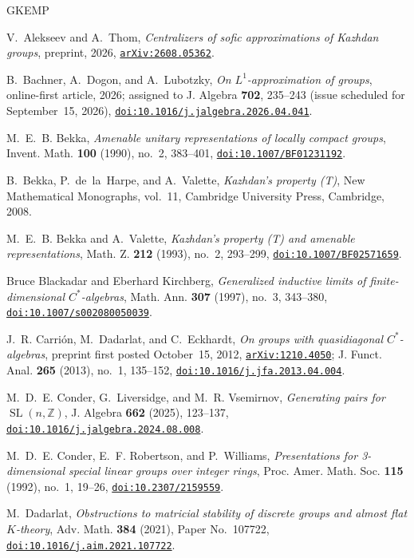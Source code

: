 \documentclass[11pt]{amsart}
\newcommand{\doi}[1]{\href{https://doi.org/#1}{\nolinkurl{doi:#1}}}
\newcommand{\arxiv}[1]{\href{https://arxiv.org/abs/#1}{\nolinkurl{arXiv:#1}}}
\theoremstyle{definition}
\theoremstyle{remark}
\theoremstyle{plain}
\newcommand{\SL}{\operatorname{SL}}
\begin{document}
\begin{thebibliography}{GKEMP}

V.~Alekseev and A.~Thom,
\emph{Centralizers of sofic approximations of Kazhdan groups},
preprint, 2026, \arxiv{2608.05362}.

B.~Bachner, A.~Dogon, and A.~Lubotzky,
\emph{On $L^1$-approximation of groups},
online-first article, 2026; assigned to J. Algebra \textbf{702}, 235--243
(issue scheduled for September~15, 2026),
\doi{10.1016/j.jalgebra.2026.04.041}.

M.~E.~B. Bekka,
\emph{Amenable unitary representations of locally compact groups},
Invent. Math. \textbf{100} (1990), no.~2, 383--401,
\doi{10.1007/BF01231192}.

B.~Bekka, P.~de~la~Harpe, and A.~Valette,
\emph{Kazhdan's property \textup{(T)}},
New Mathematical Monographs, vol.~11,
Cambridge University Press, Cambridge, 2008.

M.~E.~B. Bekka and A.~Valette,
\emph{Kazhdan's property (T) and amenable representations},
Math. Z. \textbf{212} (1993), no.~2, 293--299,
\doi{10.1007/BF02571659}.

Bruce Blackadar and Eberhard Kirchberg,
\emph{Generalized inductive limits of finite-dimensional
$C^*$-algebras},
Math. Ann. \textbf{307} (1997), no.~3, 343--380,
\doi{10.1007/s002080050039}.

J.~R. Carri\'on, M.~Dadarlat, and C.~Eckhardt,
\emph{On groups with quasidiagonal $C^*$-algebras},
preprint first posted October~15, 2012, \arxiv{1210.4050};
J. Funct. Anal. \textbf{265} (2013), no.~1, 135--152,
\doi{10.1016/j.jfa.2013.04.004}.

M.~D.~E. Conder, G.~Liversidge, and M.~R. Vsemirnov,
\emph{Generating pairs for $\SL(n,\mathbb Z)$},
J. Algebra \textbf{662} (2025), 123--137,
\doi{10.1016/j.jalgebra.2024.08.008}.

M.~D.~E. Conder, E.~F. Robertson, and P.~Williams,
\emph{Presentations for 3-dimensional special linear groups over integer
rings},
Proc. Amer. Math. Soc. \textbf{115} (1992), no.~1, 19--26,
\doi{10.2307/2159559}.

M.~Dadarlat,
\emph{Obstructions to matricial stability of discrete groups and almost
flat $K$-theory},
Adv. Math. \textbf{384} (2021), Paper No.~107722,
\doi{10.1016/j.aim.2021.107722}.


\end{thebibliography}
\end{document}
